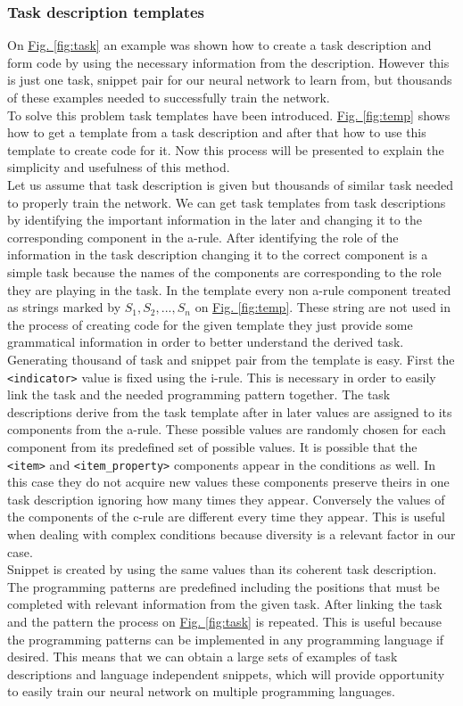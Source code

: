 \documentclass[12pt]{article}
\newcommand{\refThis}[2]{\hyperref[#1]{#2 \ref{#1}}}
\begin{document}
    \subsubsection{Task description templates}
    On \refThis{fig:task}{Fig.} an example was shown how to create a task description and form code by using the necessary information from the description. However this is just one task, snippet pair for our neural network to learn from, but thousands of these examples needed to successfully train the network.\\
    To solve this problem task templates have been introduced. \refThis{fig:temp}{Fig.} shows how to get a template from a task description and after that how to use this template to create code for it. Now this process will be presented to explain the simplicity and usefulness of this method. \\
    Let us assume that task description is given but thousands of similar task needed to properly train the network. We can get task templates from task descriptions by identifying the important information in the later and changing it to the corresponding component in the a-rule. After identifying the role of the information in the task description changing it to the correct component is a simple task because the names of the components are corresponding to the role they are playing in the task. In the template every non a-rule component treated as strings marked by $S_1, S_2, ... ,S_n$ on \refThis{fig:temp}{Fig.}. These string are not used in the process of creating code for the given template they just provide some grammatical information in order to better understand the derived task. \\
    Generating thousand of task and snippet pair from the template is easy. First the \verb|<indicator>| value is fixed using the i-rule. This is necessary in order to easily link the task and the needed programming pattern together. The task descriptions derive from the task template after in later values are assigned to its components from the a-rule. These possible values are randomly chosen for each component from its predefined set of possible values. It is possible that the \verb|<item>| and \verb|<item_property>| components appear in the conditions as well. In this case they do not acquire new values these components preserve theirs in one task description ignoring how many times they appear. Conversely the values of the components of the c-rule are different every time they appear. This is useful when dealing with complex conditions because diversity is a relevant factor in our case.\\
    Snippet is created by using the same values than its coherent task description. The programming patterns are predefined including the positions that must be completed with relevant information from the given task. After linking the task and the pattern the process on \refThis{fig:task}{Fig.} is repeated. This is useful because the programming patterns can be implemented in any programming language if desired. This means that we can obtain a large sets of examples of task descriptions and language independent snippets, which will provide opportunity to easily train our neural network on multiple programming languages.
\end{document}
